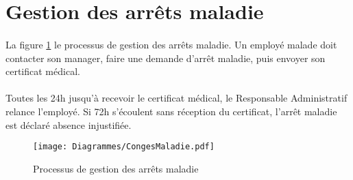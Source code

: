 \section{Gestion des arrêts maladie}
\paragraph{} La figure \ref{maladie} le processus de gestion des arrêts maladie. Un employé malade doit contacter son manager, faire une demande d'arrêt maladie, puis envoyer son certificat médical.
\paragraph{} Toutes les 24h jusqu'à recevoir le certificat médical, le Responsable Administratif relance l'employé. Si 72h s'écoulent sans réception du certificat, l'arrêt maladie est déclaré absence injustifiée.

\begin{figure}
\centering
	\texttt{[image: Diagrammes/CongesMaladie.pdf]}
	\caption{Processus de gestion des arrêts maladie}
	\label{maladie}
\end{figure}

